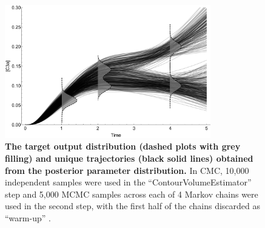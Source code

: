 \begin{figure}[H]
	\centerline{\includegraphics[width=0.8\textwidth]{../figures/tnf_samples_vs_distribution.pdf}}
	\caption{\textbf{The target output distribution (dashed plots with grey filling) and unique trajectories (black solid lines) obtained from the posterior parameter distribution.} In CMC, 10,000 independent samples were used in the ``ContourVolumeEstimator'' step and 5,000 MCMC samples across each of 4 Markov chains were used in the second step, with the first half of the chains discarded as ``warm-up'' \cite{lambert2018Student}.}
	\label{fig:tnf_samples_vs_distribution}
\end{figure}

